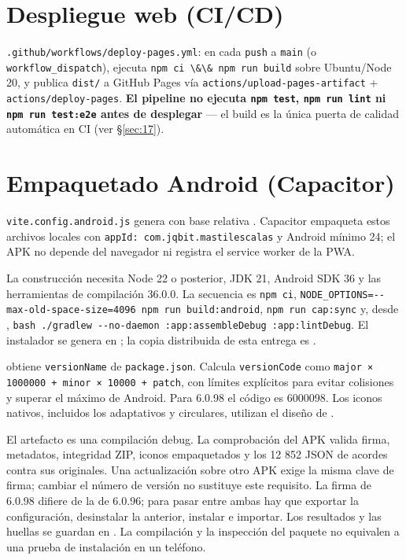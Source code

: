 \documentclass[a4paper,11pt,oneside]{report}
\newcommand{\Sref}[1]{\S\ref{#1}}
\begin{document}
\section{Despliegue web (CI/CD)}
\label{sec:16.2}

\lstinline!.github/workflows/deploy-pages.yml!: en cada \lstinline!push! a \lstinline!main! (o \lstinline!workflow_dispatch!), ejecuta \lstinline!npm ci \&\& npm run build! sobre Ubuntu/Node 20, y publica \lstinline!dist/! a GitHub Pages vía \lstinline!actions/upload-pages-artifact! + \lstinline!actions/deploy-pages!. \textbf{El pipeline no ejecuta \lstinline!npm test!, \lstinline!npm run lint! ni \lstinline!npm run test:e2e! antes de desplegar} --- el build es la única puerta de calidad automática en CI (ver \Sref{sec:17}).

\section{Empaquetado Android (Capacitor)}
\label{sec:16.3}
\begingroup\sloppy
\texttt{vite.config.android.js} genera  con base
relativa . Capacitor empaqueta estos archivos locales con
\texttt{appId: com.jqbit.mastilescalas} y Android mínimo 24; el APK no
depende del navegador ni registra el service worker de la PWA.

La construcción necesita Node 22 o posterior, JDK 21, Android SDK 36 y
las herramientas de compilación 36.0.0. La secuencia es
\texttt{npm ci},
\texttt{NODE\_OPTIONS=-\/-max-old-space-size=4096 npm run build:android},
\texttt{npm run cap:sync} y, desde ,
\texttt{bash ./gradlew -\/-no-daemon :app:assembleDebug :app:lintDebug}.
El instalador se genera en
; la copia
distribuida de esta entrega es
.

 obtiene \texttt{versionName} de
\texttt{package.json}. Calcula \texttt{versionCode} como
\texttt{major × 1000000 + minor × 10000 + patch}, con límites
explícitos para evitar colisiones y superar el máximo de Android. Para
6.0.98 el código es 6000098. Los iconos nativos, incluidos los
adaptativos y circulares, utilizan el diseño de
.

El artefacto es una compilación debug. La comprobación del APK valida
firma, metadatos, integridad ZIP, iconos empaquetados y los 12 852 JSON
de acordes contra sus originales. Una actualización sobre otro APK exige
la misma clave de firma; cambiar el número de versión no sustituye este
requisito. La firma de 6.0.98 difiere de la de 6.0.96; para pasar entre
ambas hay que exportar la configuración, desinstalar la anterior,
instalar e importar. Los resultados y las huellas se guardan en
. La
compilación y la inspección del paquete no equivalen a una prueba de
instalación en un teléfono.
\end{document}
